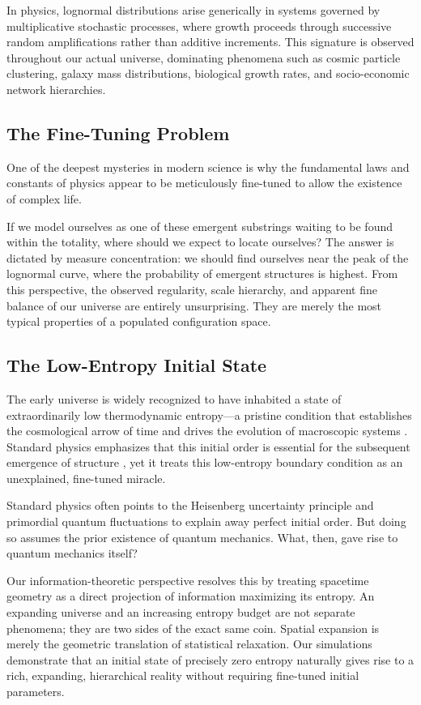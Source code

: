 In physics, lognormal distributions arise generically in systems governed by multiplicative stochastic processes, where growth proceeds through successive random amplifications rather than additive increments. This signature is observed throughout our actual universe, dominating phenomena such as cosmic particle clustering, galaxy mass distributions, biological growth rates, and socio-economic network hierarchies.

\subsection*{The Fine-Tuning Problem}

One of the deepest mysteries in modern science is why the fundamental laws and constants of physics appear to be meticulously fine-tuned to allow the existence of complex life.

If we model ourselves as one of these emergent substrings waiting to be found within the totality, where should we expect to locate ourselves? The answer is dictated by measure concentration: we should find ourselves near the peak of the lognormal curve, where the probability of emergent structures is highest. From this perspective, the observed regularity, scale hierarchy, and apparent fine balance of our universe are entirely unsurprising. They are merely the most typical properties of a populated configuration space.

\subsection*{The Low-Entropy Initial State}

The early universe is widely recognized to have inhabited a state of extraordinarily low thermodynamic entropy—a pristine condition that establishes the cosmological arrow of time and drives the evolution of macroscopic systems \cite{penrose2010, carroll2010}. Standard physics emphasizes that this initial order is essential for the subsequent emergence of structure \cite{hawking1988, hawking1996nature}, yet it treats this low-entropy boundary condition as an unexplained, fine-tuned miracle. 

Standard physics often points to the Heisenberg uncertainty principle and primordial quantum fluctuations to explain away perfect initial order. But doing so assumes the prior existence of quantum mechanics. What, then, gave rise to quantum mechanics itself?

Our information-theoretic perspective resolves this by treating spacetime geometry as a direct projection of information maximizing its entropy. An expanding universe and an increasing entropy budget are not separate phenomena; they are two sides of the exact same coin. Spatial expansion is merely the geometric translation of statistical relaxation. Our simulations demonstrate that an initial state of precisely zero entropy naturally gives rise to a rich, expanding, hierarchical reality without requiring fine-tuned initial parameters.


